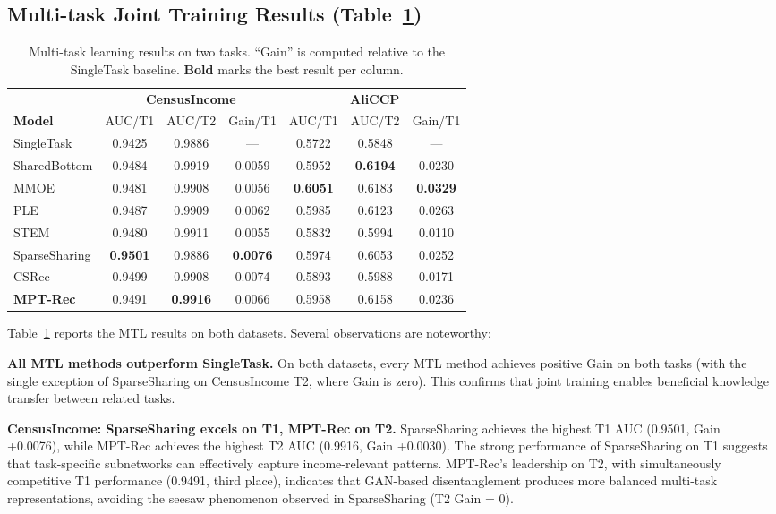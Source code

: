 \documentclass[review,anonymous]{acmart}
\begin{document}
\subsection{Multi-task Joint Training Results (Table~\ref{tab:mtl_results})}

\begin{table}[t]
  \centering
  \caption{Multi-task learning results on two tasks. ``Gain'' is computed relative to
           the SingleTask baseline. \textbf{Bold} marks the best result per column.}
  \label{tab:mtl_results}
  \begin{tabular}{lcccccc}
    \toprule
    & \multicolumn{3}{c}{\textbf{CensusIncome}} & \multicolumn{3}{c}{\textbf{AliCCP}} \\
    \cmidrule(lr){2-4} \cmidrule(lr){5-7}
    \textbf{Model} & AUC/T1 & AUC/T2 & Gain/T1 & AUC/T1 & AUC/T2 & Gain/T1 \\
    \midrule
    SingleTask   & 0.9425 & 0.9886 & ---    & 0.5722 & 0.5848 & --- \\
    SharedBottom & 0.9484 & 0.9919 & 0.0059 & 0.5952 & \textbf{0.6194} & 0.0230 \\
    MMOE         & 0.9481 & 0.9908 & 0.0056 & \textbf{0.6051} & 0.6183 & \textbf{0.0329} \\
    PLE          & 0.9487 & 0.9909 & 0.0062 & 0.5985 & 0.6123 & 0.0263 \\
    STEM         & 0.9480 & 0.9911 & 0.0055 & 0.5832 & 0.5994 & 0.0110 \\
    SparseSharing& \textbf{0.9501} & 0.9886 & \textbf{0.0076} & 0.5974 & 0.6053 & 0.0252 \\
    CSRec        & 0.9499 & 0.9908 & 0.0074 & 0.5893 & 0.5988 & 0.0171 \\
    \textbf{MPT-Rec} & 0.9491 & \textbf{0.9916} & 0.0066 & 0.5958 & 0.6158 & 0.0236 \\
    \bottomrule
  \end{tabular}
\end{table}

Table~\ref{tab:mtl_results} reports the MTL results on both datasets. Several
observations are noteworthy:

\textbf{All MTL methods outperform SingleTask.} On both datasets, every MTL
method achieves positive Gain on both tasks (with the single exception of
SparseSharing on CensusIncome T2, where Gain is zero). This confirms that joint
training enables beneficial knowledge transfer between related tasks.

\textbf{CensusIncome: SparseSharing excels on T1, MPT-Rec on T2.}
SparseSharing achieves the highest T1 AUC (0.9501, Gain +0.0076), while MPT-Rec
achieves the highest T2 AUC (0.9916, Gain +0.0030). The strong performance of
SparseSharing on T1 suggests that task-specific subnetworks can effectively
capture income-relevant patterns. MPT-Rec's leadership on T2, with
simultaneously competitive T1 performance (0.9491, third place), indicates that
GAN-based disentanglement produces more balanced multi-task representations,
avoiding the seesaw phenomenon observed in SparseSharing (T2 Gain = 0).
\end{document}
